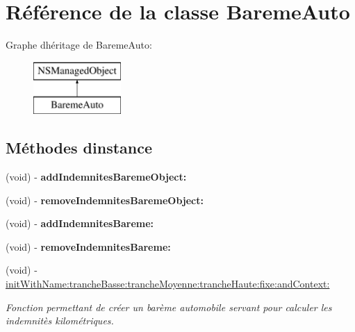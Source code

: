 \hypertarget{interface_bareme_auto}{}\section{Référence de la classe Bareme\+Auto}
\label{interface_bareme_auto}
Graphe d\textquotesingle{}héritage de Bareme\+Auto\+:\begin{figure}[H]
\begin{center}
\leavevmode
\includegraphics[height=2.000000cm]{interface_bareme_auto}
\end{center}
\end{figure}
\subsection*{Méthodes d\textquotesingle{}instance}
\begin{DoxyCompactItemize}
\item 
\hypertarget{interface_bareme_auto_a90a3c937866419653659f4c25d64c1e9}{}(void) -\/ {\bfseries add\+Indemnites\+Bareme\+Object\+:}\label{interface_bareme_auto_a90a3c937866419653659f4c25d64c1e9}

\item 
\hypertarget{interface_bareme_auto_a74fdfbb37e59ec1ff9eb5e1bca72f12a}{}(void) -\/ {\bfseries remove\+Indemnites\+Bareme\+Object\+:}\label{interface_bareme_auto_a74fdfbb37e59ec1ff9eb5e1bca72f12a}

\item 
\hypertarget{interface_bareme_auto_a12e912c1fd62b9c012c3fcb6926a02ad}{}(void) -\/ {\bfseries add\+Indemnites\+Bareme\+:}\label{interface_bareme_auto_a12e912c1fd62b9c012c3fcb6926a02ad}

\item 
\hypertarget{interface_bareme_auto_a7064024cb0ba4de064465621f05a12ff}{}(void) -\/ {\bfseries remove\+Indemnites\+Bareme\+:}\label{interface_bareme_auto_a7064024cb0ba4de064465621f05a12ff}

\item 
(void) -\/ \hyperlink{interface_bareme_auto_a34905aa0136303afc3abde9c3978fc11}{init\+With\+Name\+:tranche\+Basse\+:tranche\+Moyenne\+:tranche\+Haute\+:fixe\+:and\+Context\+:}
\begin{DoxyCompactList}\small\item\em Fonction permettant de créer un barème automobile servant pour calculer les indemnitès kilométriques. \end{DoxyCompactList}\end{DoxyCompactItemize}
